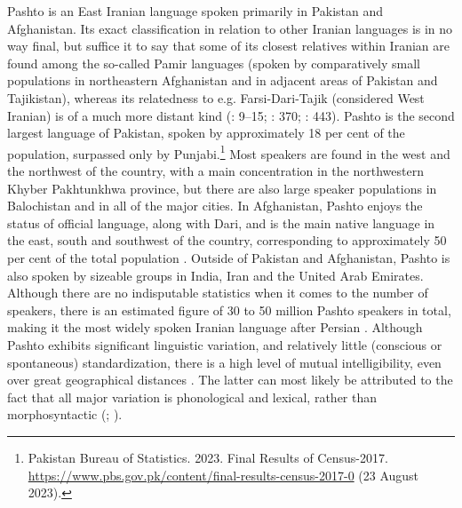 \documentclass[output=paper,colorlinks,citecolor=brown]{langscibook}
\begin{document}
Pashto is an East Iranian language spoken primarily in Pakistan and Afghani\-stan. Its exact classification in relation to other Iranian languages is in no way final, but suffice it to say that some of its closest relatives within Iranian are found among the so-called Pamir languages (spoken by comparatively small populations in northeastern Afghanistan and in adjacent areas of Pakistan and Tajikistan), whereas its relatedness to e.g. Farsi-Dari-Tajik (considered West Iranian) is of a much more distant kind (\citealt{Windfuhr2009}: 9–15; \citealt{Skjaervø1989a}: 370; \citealt{MacKenzie2009}: 443). Pashto is the second largest language of Pakistan, spoken by approximately 18 per cent of the population, surpassed only by Punjabi.\footnote{Pakistan Bureau of Statistics. 2023. Final Results of Census-2017. \url{https://www.pbs.gov.pk/content/final-results-census-2017-0} (23 August 2023).}
Most speakers are found in the west and the northwest of the country, with a main concentration in the northwestern Khyber Pakhtunkhwa province, but there are also large speaker populations in Balochistan and in all of the major cities. In Afghanistan, Pashto enjoys the status of official language, along with Dari, and is the main native language in the east, south and southwest of the country, corresponding to approximately 50 per cent of the total population \citep[721]{RobsonTegey2009}. Outside of Pakistan and Afghanistan, Pashto is also spoken by sizeable groups in India, Iran and the United Arab Emirates. Although there are no indisputable statistics when it comes to the number of speakers, there is an estimated figure of 30 to 50 million Pashto speakers in total, making it the most widely spoken Iranian language after Persian \citep[460]{MacKenzie2009}. Although Pashto exhibits significant linguistic variation, and relatively little (conscious or spontaneous) standardization, there is a high level of mutual intelligibility, even over great geographical distances \citep[721--722, 766]{RobsonTegey2009}. The latter can most likely be attributed to the fact that all major variation is phonological and lexical, rather than morphosyntactic (\citealt[231]{MacKenzie1959}; \citealt[736]{Elfenbein1997}). 
\end{document}
